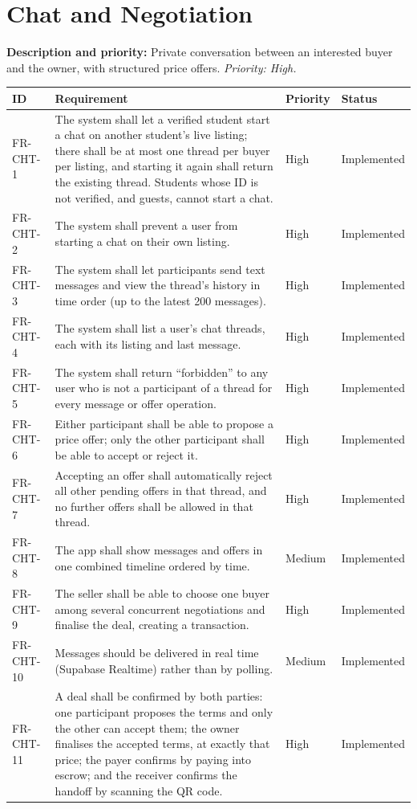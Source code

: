 \documentclass[11pt,a4paper]{scrreprt}
\newenvironment{reqtable}{%
  \small
  \begin{longtable}{>{\raggedright\arraybackslash\ttfamily\footnotesize}p{2.05cm} L{8.85cm} L{1.45cm} L{2.05cm}}
  \toprule
  \normalfont\normalsize\textbf{ID} & \textbf{Requirement} & \textbf{Priority} & \textbf{Status}\\
  \midrule\endhead
  \bottomrule\endfoot
}{\end{longtable}}
\newcommand{\impl}{Implemented}
\begin{document}
\section{Chat and Negotiation}
\textbf{Description and priority:} Private conversation between an
interested buyer and the owner, with structured price offers.
\emph{Priority: High.}

\begin{reqtable}
FR-CHT-1 & The system shall let a verified student start a chat on another student's live listing; there shall be at most one thread per buyer per listing, and starting it again shall return the existing thread. Students whose ID is not verified, and guests, cannot start a chat. & High & \impl\\
FR-CHT-2 & The system shall prevent a user from starting a chat on their own listing. & High & \impl\\
FR-CHT-3 & The system shall let participants send text messages and view the thread's history in time order (up to the latest 200 messages). & High & \impl\\
FR-CHT-4 & The system shall list a user's chat threads, each with its listing and last message. & High & \impl\\
FR-CHT-5 & The system shall return ``forbidden'' to any user who is not a participant of a thread for every message or offer operation. & High & \impl\\
FR-CHT-6 & Either participant shall be able to propose a price offer; only the other participant shall be able to accept or reject it. & High & \impl\\
FR-CHT-7 & Accepting an offer shall automatically reject all other pending offers in that thread, and no further offers shall be allowed in that thread. & High & \impl\\
FR-CHT-8 & The app shall show messages and offers in one combined timeline ordered by time. & Medium & \impl\\
FR-CHT-9 & The seller shall be able to choose one buyer among several concurrent negotiations and finalise the deal, creating a transaction. & High & \impl\\
FR-CHT-10 & Messages should be delivered in real time (Supabase Realtime) rather than by polling. & Medium & \impl\\
FR-CHT-11 & A deal shall be confirmed by both parties: one participant proposes the terms and only the other can accept them; the owner finalises the accepted terms, at exactly that price; the payer confirms by paying into escrow; and the receiver confirms the handoff by scanning the QR code. & High & \impl\\
\end{reqtable}
\end{document}
